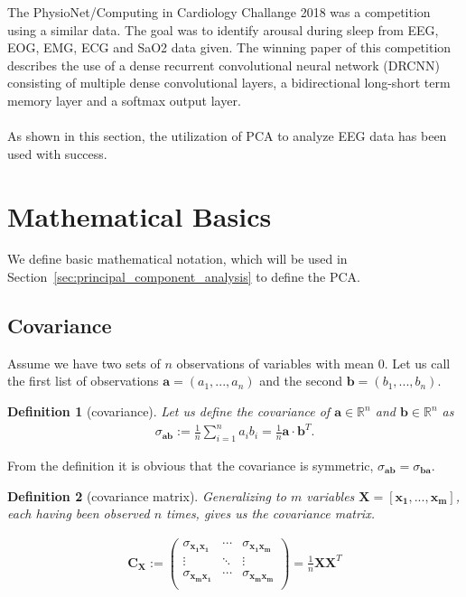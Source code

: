 \documentclass[a4paper]{IEEEtran}
\newtheorem{definition}{Definition}
\begin{document}
The PhysioNet/Computing in Cardiology Challange 2018 was a competition using a similar data\cite{Ghassemi2018}. The goal was to identify arousal during sleep from EEG, EOG, EMG, ECG and SaO2 data given. The winning paper of this competition describes the use of a dense recurrent convolutional neural network (DRCNN) consisting of multiple dense convolutional layers, a bidirectional long-short term memory layer and a softmax output layer\cite{Howe2018}.
\\
\\
As shown in this section, the utilization of PCA to analyze EEG data has been used with success.

\section{Mathematical Basics}
\label{sec:mathematical_basics}

We define basic mathematical notation, which will be used in Section~\ref{sec:principal_component_analysis} to define the PCA.

\subsection{Covariance}
Assume we have two sets of $n$ observations of variables with mean 0. Let us call the first list of observations $\mathbf{a} = (a_1, ..., a_n)$ and the second $\mathbf{b} = (b_1, ..., b_n)$.

\begin{definition}[covariance]
Let us define the \textit{covariance} of $\mathbf{a} \in \mathbb{R}^n$ and $\mathbf{b} \in \mathbb{R}^n$ as
\begin{align*}
	\sigma_{\mathbf{ab}} := \frac{1}{n} \sum_{i=1}^{n}a_ib_i = \frac{1}{n}\mathbf{a}\cdot\mathbf{b}^T.
\end{align*}
\end{definition}

From the definition it is obvious that the covariance is symmetric, $\sigma_{\mathbf{ab}} = \sigma_{\mathbf{ba}}$.

\begin{definition}[covariance matrix]
Generalizing to $m$ variables $\mathbf{X} = [\mathbf{x_1}, ..., \mathbf{x_m}]$, each having been observed $n$ times, gives us the \textit{covariance matrix}.

\begin{align*}
	\mathbf{C_X} := \left(\begin{matrix}
		\sigma_{\mathbf{x_1x_1}}	& \cdots & \sigma_{\mathbf{x_1x_m}}	\\
		\vdots						& \ddots & \vdots					\\
		\sigma_{\mathbf{x_mx_1}}	& \cdots & \sigma_{\mathbf{x_mx_m}}	\\
	\end{matrix}\right) = \frac{1}{n} \mathbf{X}\mathbf{X}^T
\end{align*}
\end{definition}
\end{document}
